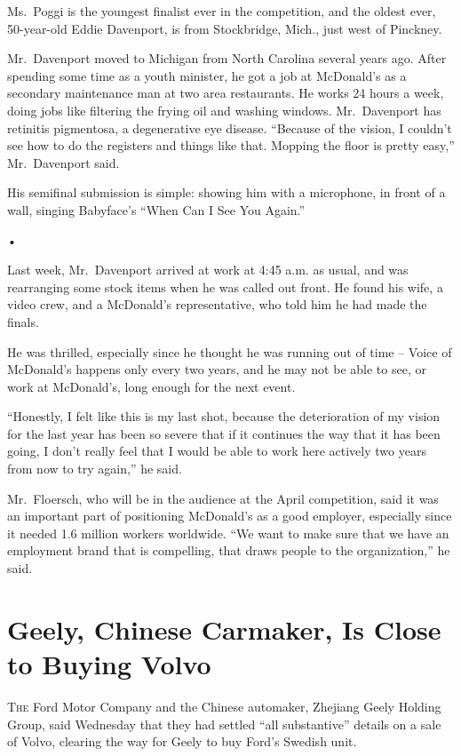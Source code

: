 ﻿\documentclass[12pt]{article}
\begin{document}
Ms.~Poggi is the youngest finalist ever in the competition, and the oldest ever, 50-year-old Eddie
Davenport, is from Stockbridge, Mich., just west of Pinckney.

Mr.~Davenport moved to Michigan from North Carolina several years ago. After spending some time as a
youth minister, he got a job at McDonald's as a secondary maintenance man at two area restaurants.
He works 24 hours a week, doing jobs like filtering the frying oil and washing windows.
Mr.~Davenport has retinitis pigmentosa, a degenerative eye disease. ``Because of the vision, I
couldn't see how to do the registers and things like that. Mopping the floor is pretty easy,''
Mr.~Davenport said.

His semifinal submission is simple: showing him with a microphone, in front of a wall, singing
Babyface's ``When Can I See You Again.''

•

Last week, Mr.~Davenport arrived at work at 4:45 a.m. as usual, and was rearranging some stock items
when he was called out front. He found his wife, a video crew, and a McDonald's representative, who
told him he had made the finals.

He was thrilled, especially since he thought he was running out of time -- Voice of McDonald's
happens only every two years, and he may not be able to see, or work at McDonald's, long enough for
the next event.

``Honestly, I felt like this is my last shot, because the deterioration of my vision for the last
year has been so severe that if it continues the way that it has been going, I don't really feel
that I would be able to work here actively two years from now to try again,'' he said.

Mr.~Floersch, who will be in the audience at the April competition, said it was an important part of
positioning McDonald's as a good employer, especially since it needed 1.6 million workers worldwide.
``We want to make sure that we have an employment brand that is compelling, that draws people to the
organization,'' he said.

\section{Geely, Chinese Carmaker, Is Close to Buying Volvo}

\lettrine{T}{he} Ford Motor Company and the Chinese automaker, Zhejiang
Geely Holding Group, said Wednesday that they had settled ``all substantive'' details on a sale of
Volvo, clearing the way for Geely to buy Ford's Swedish unit.
\end{document}
